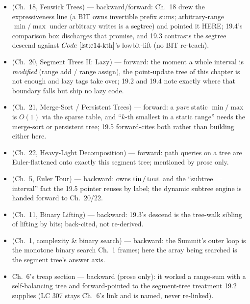 \begin{itemize}[nosep, leftmargin=1.4em]
  \item {} (Ch.~18, Fenwick Trees) --- backward/forward: Ch.~18 drew the
        expressiveness line (a BIT owns invertible prefix sums; arbitrary-range
        \(\min/\max\) under arbitrary writes is a segtree) and pointed it HERE;
        19.4's comparison box discharges that promise, and 19.3 contrasts the segtree
        descend against \(\coderef{c14-kth}\)'s lowbit-lift (no BIT re-teach).
  \item {} (Ch.~20, Segment Trees II: Lazy) --- forward: the moment a whole
        interval is \emph{modified} (range add / range assign), the point-update tree
        of this chapter is not enough and lazy tags take over; 19.2 and 19.4 note
        exactly where that boundary falls but ship no lazy code.
  \item {} (Ch.~21, Merge-Sort / Persistent Trees) --- forward: a \emph{pure}
        static \(\min/\max\) is \(O(1)\) via the sparse table, and ``\(k\)-th smallest
        in a static range'' needs the merge-sort or persistent tree; 19.5 forward-cites
        both rather than building either here.
  \item {} (Ch.~22, Heavy-Light Decomposition) --- forward: path queries on a
        tree are Euler-flattened onto exactly this segment tree; mentioned by prose only.
  \item {} (Ch.~5, Euler Tour) --- backward: owns \(\operatorname{tin}/\operatorname{tout}\) and the
        ``subtree \(=\) interval'' fact the 19.5 pointer reuses by label; the dynamic
        subtree engine is handed forward to Ch.~20/22.
  \item {} (Ch.~11, Binary Lifting) --- backward: 19.3's descend is the
        tree-walk sibling of lifting by bits; back-cited, not re-derived.
  \item {} (Ch.~1, complexity \& binary search) --- backward: the Summit's
        outer loop is the monotone binary search Ch.~1 frames; here the array being
        searched is the segment tree's answer axis.
  \item Ch.~6's treap section --- backward (prose only): it worked a range-sum with a
        self-balancing tree and forward-pointed to the segment-tree treatment 19.2
        supplies (LC 307 stays Ch.~6's link and is named, never re-linked).
\end{itemize}

